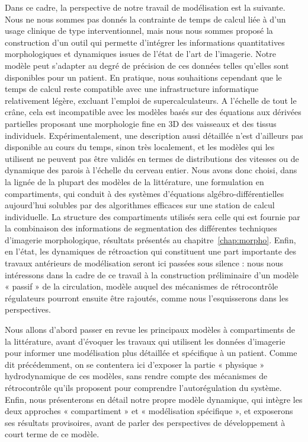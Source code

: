 Dans ce cadre, la perspective de notre travail de modélisation est la suivante. Nous ne nous
sommes pas donnés la contrainte de temps de calcul liée à d'un usage clinique de type interventionnel,
mais nous nous sommes proposé la construction d'un outil qui permette d'intégrer les informations
quantitatives morphologiques et dynamiques issues de l'état de l'art de l'imagerie. Notre modèle peut
s'adapter au degré de précision de ces données telles qu’elles sont disponibles pour un patient. En
pratique, nous souhaitions cependant que le temps de calcul reste compatible avec une infrastructure
informatique relativement légère, excluant l'emploi de supercalculateurs. A l'échelle de tout le crâne,
cela est incompatible avec les modèles basés sur des équations aux dérivées partielles proposant une
morphologie fine en 3D des vaisseaux et des tissus individuels. Expérimentalement, une description
aussi détaillée n'est d'ailleurs pas disponible au cours du temps, sinon très localement, et les modèles
qui les utilisent ne peuvent pas être validés en termes de distributions des vitesses ou de dynamique
des parois à l'échelle du cerveau entier. Nous avons donc choisi, dans la lignée de la plupart des
modèles de la littérature, une formulation en compartiments, qui conduit à des systèmes d'équations
algébro-différentielles aujourd'hui solubles par des algorithmes efficaces sur une station de calcul
individuelle. La structure des compartiments utilisés sera celle qui est fournie par la combinaison des
informations de segmentation des différentes techniques d'imagerie morphologique, résultats
présentés au chapitre~\ref{chap:morpho}. Enfin, en l'état, les dynamiques de rétroaction qui constituent une part
importante des travaux antérieurs de modélisation seront ici passées sous silence : nous nous
intéressons dans la cadre de ce travail à la construction préliminaire d'un modèle « passif » de la
circulation, modèle auquel des mécanismes de rétrocontrôle régulateurs pourront ensuite être
rajoutés, comme nous l'esquisserons dans les perspectives.

Nous allons d'abord passer en revue les principaux modèles à compartiments de la littérature,
avant d'évoquer les travaux qui utilisent les données d'imagerie pour informer une modélisation plus
détaillée et spécifique à un patient. Comme dit précédemment, on se contentera ici d'exposer la partie
« physique » hydrodynamique de ces modèles, sans rendre compte des mécanismes de rétrocontrôle
qu'ils proposent pour comprendre l'autorégulation du système. Enfin, nous présenterons en détail notre propre modèle dynamique, qui intègre les deux approches « compartiment » et « modélisation
spécifique », et exposerons ses résultats provisoires, avant de parler des perspectives de
développement à court terme de ce modèle.
